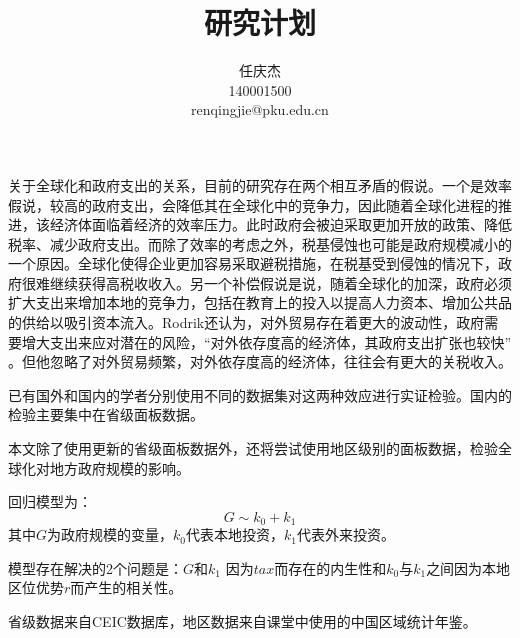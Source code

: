\documentclass[10pt]{article}
\author{任庆杰\\
		140001500\\
		renqingjie@pku.edu.cn}
\title{研究计划}
\begin{document}
\maketitle
关于全球化和政府支出的关系，目前的研究存在两个相互矛盾的假说\cite{garrett2001globalization}\cite{wangyu2014}。一个是效率假说，较高的政府支出，会降低其在全球化中的竞争力，因此随着全球化进程的推进，该经济体面临着经济的效率压力。此时政府会被迫采取更加开放的政策、降低税率、减少政府支出\cite{wangyu2014}。而除了效率的考虑之外，税基侵蚀也可能是政府规模减小的一个原因。全球化使得企业更加容易采取避税措施，在税基受到侵蚀的情况下，政府很难继续获得高税收收入\cite{tanzi2000globalization}。另一个补偿假说是说，随着全球化的加深，政府必须扩大支出来增加本地的竞争力，包括在教育上的投入以提高人力资本、增加公共品的供给以吸引资本流入\cite{rodrik1998more}。Rodrik还认为，对外贸易存在着更大的波动性，政府需要增大支出来应对潜在的风险，“对外依存度高的经济体，其政府支出扩张也较快” \cite{rodrik1998more}。但他忽略了对外贸易频繁，对外依存度高的经济体，往往会有更大的关税收入\cite{tanzi1973theory}。

已有国外和国内的学者分别使用不同的数据集对这两种效应进行实证检验。国内的检验主要集中在省级面板数据。

本文除了使用更新的省级面板数据外，还将尝试使用地区级别的面板数据，检验全球化对地方政府规模的影响。

回归模型为：
\begin{equation}
{G} \sim {k_0} + {k_1}
\end{equation}
其中$G$为政府规模的变量，$k_0$代表本地投资，$k_1$代表外来投资。

模型存在解决的2个问题是：$G$和$k_1$ 因为$tax$而存在的内生性和$k_0$与$k_1$之间因为本地区位优势$r$而产生的相关性。

省级数据来自CEIC数据库，地区数据来自课堂中使用的中国区域统计年鉴。

\renewcommand\refname{参考文献}
%

\end{document}
